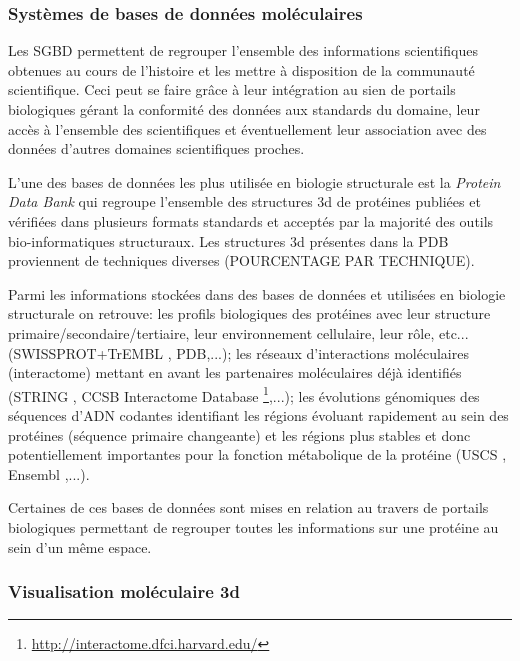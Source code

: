 \subsubsection{Systèmes de bases de données moléculaires}

Les SGBD permettent de regrouper l'ensemble des informations scientifiques obtenues au cours de l'histoire et les mettre à disposition de la communauté scientifique. Ceci peut se faire grâce à leur intégration au sien de portails biologiques gérant la conformité des données aux standards du domaine, leur accès à l'ensemble des scientifiques et éventuellement leur association avec des données d'autres domaines scientifiques proches.

L'une des bases de données les plus utilisée en biologie structurale est la \textit{Protein Data Bank} \cite{berman_protein_2000} qui regroupe l'ensemble des structures 3d de protéines publiées et vérifiées dans plusieurs formats standards et acceptés par la majorité des outils bio-informatiques structuraux. Les structures 3d présentes dans la PDB proviennent de techniques diverses (POURCENTAGE PAR TECHNIQUE).

Parmi les informations stockées dans des bases de données et utilisées en biologie structurale on retrouve: les profils biologiques des protéines avec leur structure primaire/secondaire/tertiaire, leur environnement cellulaire, leur rôle, etc... (SWISSPROT+TrEMBL \cite{boeckmann2003swiss}, PDB,...); les réseaux d'interactions moléculaires (interactome) mettant en avant les partenaires moléculaires déjà identifiés (STRING \cite{Snel15092000}, CCSB Interactome Database \footnote{\url{http://interactome.dfci.harvard.edu/}},...); les évolutions génomiques des séquences d'ADN codantes identifiant les régions évoluant rapidement au sein des protéines (séquence primaire changeante) et les régions plus stables et donc potentiellement importantes pour la fonction métabolique de la protéine (USCS \cite{kent2002human}, Ensembl \cite{hubbard2002ensembl},...). 

Certaines de ces bases de données sont mises en relation au travers de portails biologiques permettant de regrouper toutes les informations sur une protéine au sein d'un même espace.

\subsubsection{Visualisation moléculaire 3d}

